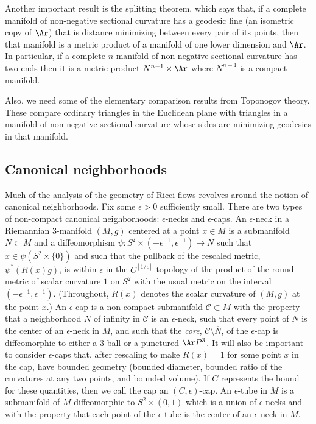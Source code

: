 Another important result is the splitting theorem, which says that, if a complete manifold of non-negative
sectional curvature has a geodesic line (an isometric copy of $\Ar$)
that is distance minimizing between every pair of its points, then
that manifold is a metric product of a manifold of one lower
dimension and $\Ar$. In particular, if a complete $n$-manifold of
non-negative sectional curvature has two ends then it is a metric
product $N^{n-1}\times \Ar$ where $N^{n-1}$ is a compact manifold.


Also, we need some of the elementary comparison results from Toponogov
theory. These compare ordinary triangles in the
Euclidean plane with triangles in a manifold of non-negative sectional
curvature whose sides are minimizing geodesics in that manifold.



\subsection{Canonical neighborhoods}

Much of the analysis of the geometry of Ricci flows revolves around
the notion of canonical neighborhoods.
Fix some $\epsilon>0$ sufficiently small. There are two types of
non-compact canonical neighborhoods: $\epsilon$-necks
and $\epsilon$-caps. An
$\epsilon$-neck in a Riemannian $3$-manifold $(M,g)$ centered at a
point $x\in M$ is a submanifold $N\subset M$ and a diffeomorphism
$\psi\colon S^2\times (-\epsilon^{-1},\epsilon^{-1})\to N$ such that
$x\in \psi(S^2\times \{0\})$ and such that the pullback of the
rescaled metric, $\psi^*(R(x)g)$, is within $\epsilon$ in the
$C^{[1/\epsilon]}$-topology of the product of the round metric of
scalar curvature $1$ on $S^2$ with the usual metric on the interval
$(-\epsilon^{-1},\epsilon^{-1})$. (Throughout, $R(x)$ denotes the
scalar curvature of $(M,g)$ at the point $x$.) An $\epsilon$-cap is
a non-compact submanifold ${\mathcal C}\subset M$ with the property
that a neighborhood $N$ of infinity in ${\mathcal C}$ is an
$\epsilon$-neck, such that every point of $N$ is the center of an
$\epsilon$-neck in $M$, and such that the {\em
core}, ${\mathcal C}\setminus
\overline N$, of the $\epsilon$-cap is diffeomorphic to either a
$3$-ball or a punctured $\Ar P^3$. It will also be important to
consider $\epsilon$-caps that, after rescaling to make $R(x)=1$ for
some point $x$ in the cap, have bounded geometry (bounded diameter,
bounded ratio of the curvatures at any two points, and bounded
volume). If $C$ represents the bound for these quantities, then we
call the cap an $(C,\epsilon)$-cap. 
 An
$\epsilon$-tube in $M$ is a submanifold of
$M$ diffeomorphic to $S^2\times (0,1)$  which is a union of
$\epsilon$-necks and with the property that each point of the
$\epsilon$-tube is the center of an $\epsilon$-neck in $M$.







